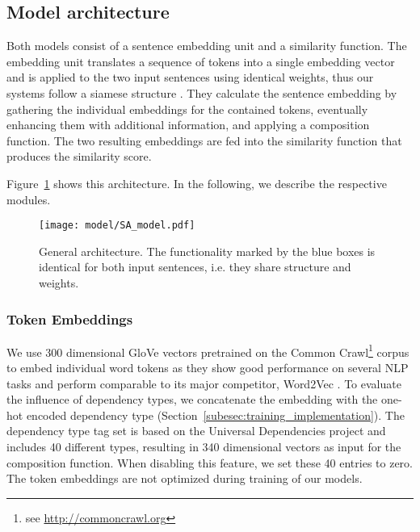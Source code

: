\subsection{Model architecture} \label{subsec:architecture}
Both models consist of a sentence embedding unit and a similarity function. The embedding unit translates a sequence of tokens into a single embedding vector and is applied to the two input sentences using identical weights, thus our systems follow a siamese structure \autocite{bromley_signature_1994}. %
They calculate the sentence embedding by gathering the individual embeddings for the contained tokens, eventually enhancing them with additional information, and applying a composition function. The two resulting embeddings are fed into the similarity function that produces the similarity score. 

Figure~\ref{fig:model_architecture} shows this architecture. In the following, we describe the respective modules. 

\begin{figure}[htb!]
	\centering
	\texttt{[image: model/SA\_model.pdf]}
	\caption{General architecture. The functionality marked by the blue boxes is identical for both input sentences, i.e. they share structure and weights.}
	\label{fig:model_architecture}
\end{figure}

\subsubsection{Token Embeddings}
We use 300 dimensional %
GloVe vectors \autocite{pennington_glove_2014} pretrained on the Common Crawl\footnote{see \url{http://commoncrawl.org}} corpus to embed individual word tokens as they show good performance on several \ac{NLP} tasks and perform comparable to its major competitor, Word2Vec \autocite{levy_improving_2015,naili_comparative_2017}. To evaluate the influence of dependency types, we concatenate the embedding with the one-hot encoded dependency type (Section~\ref{subesec:training_implementation}). %
The dependency type tag set is based on the Universal Dependencies project \autocite{nivre_universal_2016} and includes 40 different types, resulting in 340 dimensional vectors as input for the composition function. When disabling this feature, we set these 40 entries to zero. The token embeddings are not optimized during training of our models.   

